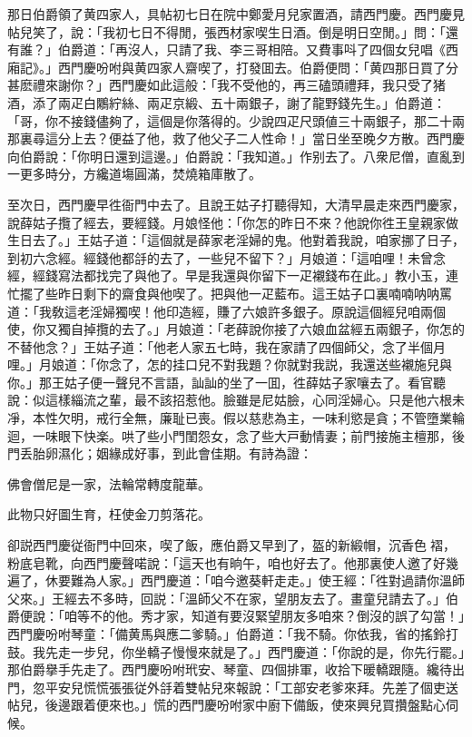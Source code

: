 那日伯爵領了黄四家人，具帖初七日在院中鄭愛月兒家置酒，請西門慶。西門慶見帖兒笑了，說：「我初七日不得閒，張西材家喫生日酒。倒是明日空閒。」問：「還有誰？」伯爵道：「再沒人，只請了我、李三哥相陪。又費事呌了四個女兒唱《西廂記》。」西門慶吩咐與黄四家人齋喫了，打發囬去。伯爵便問：「黄四那日買了分甚麽禮來謝你？」西門慶如此這般：「我不受他的，再三磕頭禮拜，我只受了猪酒，添了兩疋白鷴紵絲、兩疋京緞、五十兩銀子，謝了龍野錢先生。」伯爵道：「哥，你不接錢儘夠了，這個是你落得的。少說四疋尺頭値三十兩銀子，那二十兩那裏尋這分上去？便益了他，救了他父子二人性命！」當日坐至晚夕方散。西門慶向伯爵說：「你明日還到這邊。」伯爵說：「我知道。」作别去了。八衆尼僧，直亂到一更多時分，方纔道塲圓滿，焚燒箱庫散了。

至次日，西門慶早徃衙門中去了。且說王姑子打聽得知，大清早晨走來西門慶家，說薛姑子攬了經去，要經錢。月娘怪他：「你怎的昨日不來？他說你徃王皇親家做生日去了。」王姑子道：「這個就是薛家老淫婦的鬼。他對着我說，咱家挪了日子，到初六念經。經錢他都㧱的去了，一些兒不留下？」月娘道：「這咱哩！未曾念經，經錢寫法都找完了與他了。早是我還與你留下一疋襯錢布在此。」教小玉，連忙擺了些昨日剩下的齋食與他喫了。把與他一疋藍布。這王姑子口裏喃喃呐呐罵道：「我敎這老淫婦獨喫！他印造經，賺了六娘許多銀子。原說這個經兒咱兩個使，你又獨自掉攬的去了。」月娘道：「老薛說你接了六娘血盆經五兩銀子，你怎的不替他念？」王姑子道：「他老人家五七時，我在家請了四個師父，念了半個月哩。」月娘道：「你念了，怎的挂口兒不對我題？你就對我説，我還送些襯施兒與你。」那王姑子便一聲兒不言語，訕訕的坐了一囬，徃薛姑子家嚷去了。看官聽說：似這樣緇流之輩，最不該招惹他。臉雖是尼姑臉，心同淫婦心。只是他六根未凈，本性欠明，戒行全無，廉耻已喪。假以慈悲為主，一味利慾是貪；不管墮業輪迴，一味眼下快楽。哄了些小門閨怨女，念了些大戸動情妻；前門接施主檀那，後門丢胎卵濕化；姻緣成好事，到此會佳期。有詩為證：

\begin{myquote}
佛會僧尼是一家，法輪常轉度龍華。

此物只好圖生育，枉使金刀剪落花。
\end{myquote}

卻説西門慶従衙門中回來，喫了飯，應伯爵又早到了，盔的新緞帽，沉香色𧜽褶，粉底皂靴，向西門慶聲喏說：「這天也有晌午，咱也好去了。他那裏使人邀了好幾遍了，休要難為人家。」西門慶道：「咱今邀葵軒走走。」使王經：「徃對過請你溫師父來。」王經去不多時，回説：「溫師父不在家，望朋友去了。畫童兒請去了。」伯爵便說：「咱等不的他。秀才家，知道有要沒緊望朋友多咱來？倒沒的誤了勾當！」西門慶吩咐琴童：「備黄馬與應二爹騎。」伯爵道：「我不騎。你依我，省的搖鈴打鼓。我先走一步兒，你坐轎子慢慢來就是了。」西門慶道：「你說的是，你先行罷。」那伯爵擧手先走了。西門慶吩咐玳安、琴童、四個排軍，收拾下暖轎跟隨。纔待出門，忽平安兒慌慌張張従外㧱着雙帖兒來報說：「工部安老爹來拜。先差了個吏送帖兒，後邊跟着便來也。」慌的西門慶吩咐家中廚下備飯，使來興兒買攢盤點心伺候。

